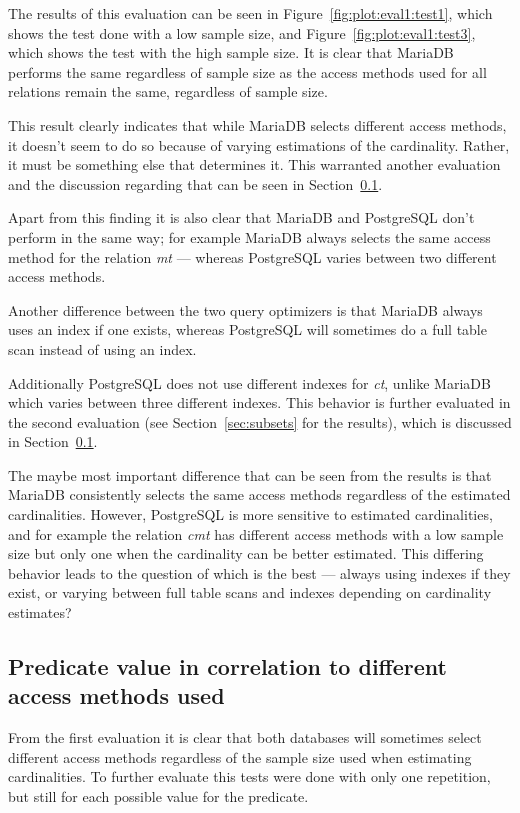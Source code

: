 The results of this evaluation can be seen in Figure~\ref{fig:plot:eval1:test1},
which shows the test done with a low sample size, and
Figure~\ref{fig:plot:eval1:test3}, which shows the test with the high sample size.
It is clear that MariaDB performs the same regardless of sample size as the
access methods used for all relations remain the same, regardless of sample size.

This result clearly indicates that while MariaDB selects different access
methods, it doesn't seem to do so because of varying estimations of the
cardinality. Rather, it must be something else that determines it. This
warranted another evaluation and the discussion regarding that can be seen in
Section~\ref{sec:predicatecorrelation}.

Apart from this finding it is also clear that MariaDB and PostgreSQL don't
perform in the same way; for example MariaDB always selects the same access method for
the relation \textit{mt} --- whereas PostgreSQL varies between two different access
methods.

Another difference between the two query optimizers is that MariaDB always uses an
index if one exists, whereas PostgreSQL will sometimes do a full table scan
instead of using an index.

Additionally PostgreSQL does not use different indexes for \textit{ct}, unlike
MariaDB which varies between three different indexes. This behavior is further
evaluated in the second evaluation (see Section~\ref{sec:subsets} for the
results), which is discussed in Section~\ref{sec:predicatecorrelation}.

The maybe most important difference that can be seen from the results
is that MariaDB consistently selects the same access methods regardless of
the estimated cardinalities. However, PostgreSQL is more sensitive to estimated
cardinalities, and for example the relation \textit{cmt} has different access methods
with a low sample size but only one when the cardinality can be better
estimated. This differing behavior leads to the question of which is the best
--- always using indexes if they exist, or varying between full table scans and
indexes depending on cardinality estimates?

\subsection{Predicate value in correlation to different access methods used}\label{sec:predicatecorrelation}
From the first evaluation it is clear that both databases will sometimes select different
access methods regardless of the sample size used when estimating cardinalities.
To further evaluate this tests were done with only one repetition, but still
for each possible value for the predicate.

